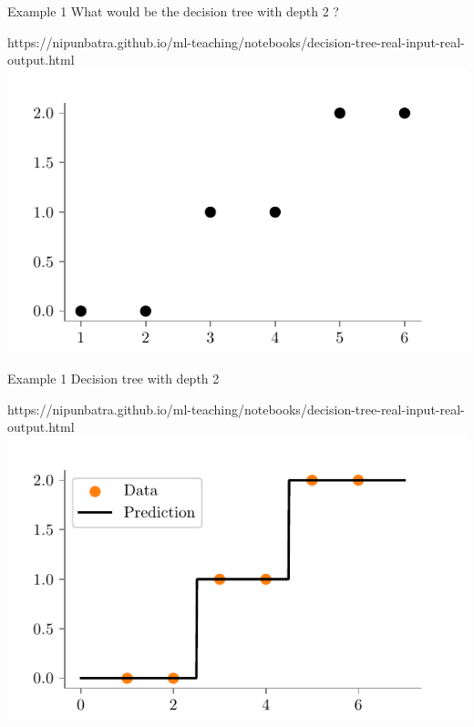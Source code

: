 \documentclass[usenames,dvipsnames]{beamer}
\begin{document}
\begin{frame}{Example 1}
What would be the decision tree with depth 2	?
\begin{center}
	\begin{notebookbox}{https://nipunbatra.github.io/ml-teaching/notebooks/decision-tree-real-input-real-output.html}
		\includegraphics{../assets/decision-trees/figures/ri-ro-dataset.pdf}
	  \end{notebookbox}
\end{center}
\end{frame}

\begin{frame}{Example 1}
	Decision tree with depth 2
	\begin{center}
		\begin{notebookbox}{https://nipunbatra.github.io/ml-teaching/notebooks/decision-tree-real-input-real-output.html}
			\includegraphics{../assets/decision-trees/figures/ri-ro-depth-2.pdf}
		\end{notebookbox}
	\end{center}
	\end{frame}
	
\end{document}
